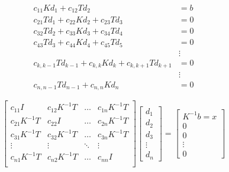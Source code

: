 \documentclass[]{article}
\begin{document}
	\begin{align}
		c_{11}Kd_1 + c_{12}Td_2 &= b\\
		c_{21}Td_1 + c_{22}Kd_2 + c_{23}Td_3 &= 0\\
		c_{32}Td_2 + c_{33}Kd_3 + c_{34}Td_4 &= 0\\
		c_{43}Td_3 + c_{44}Kd_4 + c_{45}Td_5 &= 0\\
		&\vdots\\
		c_{k,k-1}Td_{k-1} + c_{k,k}Kd_k + c_{k,k+1}Td_{k+1} &= 0\\
		&\vdots\\
		c_{n,n-1}Td_{n-1} + c_{n,n}Kd_n  &= 0
	\end{align}


	\begin{equation}
		\begin{bmatrix}
			c_{11}I & c_{12}K^{-1}T & \ldots & c_{1n}K^{-1}T\\
			c_{21}K^{-1}T & c_{22}I & \ldots & c_{2n}K^{-1}T\\
			c_{31}K^{-1}T & c_{32}K^{-1}T & \ldots & c_{3n}K^{-1}T\\
			\vdots & \vdots  & \ddots & \vdots \\
			c_{n1}K^{-1}T & c_{n2}K^{-1}T & \ldots & c_{nn}I\\
		\end{bmatrix}
		\begin{bmatrix}
			d_1\\d_2\\d_3\\\vdots\\d_n
		\end{bmatrix}
		=
		\begin{bmatrix}
			K^{-1}b=x\\0\\0\\\vdots\\0
		\end{bmatrix}
	\end{equation}
\end{document}
